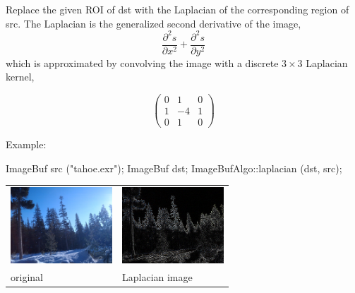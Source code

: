  
Replace the given ROI of {\cf dst} with the Laplacian of the corresponding
region of {\cf src}. The Laplacian is the generalized second derivative
of the image,
$$\frac{\partial^2 s}{\partial x^2} + \frac{\partial^2 s}{\partial y^2}$$
which is approximated by convolving the image with a discrete $3 \times 3$
Laplacian kernel,

\[ \left( \begin{array}{ccc}
0 &  1 & 0 \\
1 & -4 & 1 \\
0 &  1 & 0 \end{array} \right)\]

\smallskip
\noindent Example:
\begin{code}
    ImageBuf src ("tahoe.exr");
    ImageBuf dst;
    ImageBufAlgo::laplacian (dst, src);
\end{code}

\spc \begin{tabular}{ll}
\includegraphics[width=1.5in]{figures/tahoe-small.jpg} &
\includegraphics[width=1.5in]{figures/tahoe-laplacian.jpg} \\
original & Laplacian image \\
\end{tabular}

\apiend

 
 

